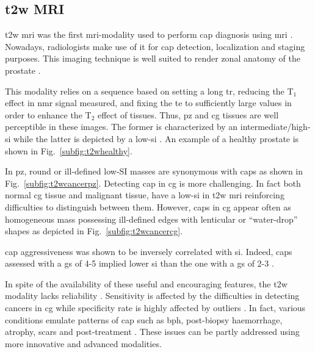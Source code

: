 \subsection{\acs*{t2w} MRI}\label{subsec:chp2:imaging:t2w} 
\ac{t2w} \ac{mri} was the first \ac{mri}-modality used to perform \ac{cap} diagnosis using \ac{mri} \cite{Hricak1983}.
Nowadays, radiologists make use of it for \ac{cap} detection, localization and staging purposes.
This imaging technique is well suited to render zonal anatomy of the prostate \cite{Barentsz2012}. 

This modality relies on a sequence based on setting a long \ac{tr}, reducing the T$_{1}$ effect in \ac{nmr} signal measured, and fixing the \ac{te} to sufficiently large values in order to enhance the T$_{2}$ effect of tissues.
Thus, \ac{pz} and \ac{cg} tissues are well perceptible in these images.
The former is characterized by an intermediate/high-\ac{si} while the latter is depicted by a low-\ac{si} \cite{Hricak1987}.
An example of a healthy prostate is shown in Fig.~\ref{subfig:t2whealthy}.

In \ac{pz}, round or ill-defined low-SI masses are synonymous with \acp{cap} \cite{Hricak1983} as shown in Fig.~\ref{subfig:t2wcancerpz}.
Detecting \ac{cap} in \ac{cg} is more challenging.
In fact both normal \ac{cg} tissue and malignant tissue, have a low-\ac{si} in \ac{t2w} \ac{mri} reinforcing difficulties to distinguish between them.
However, \acp{cap} in \ac{cg} appear often as homogeneous mass possessing ill-defined edges with lenticular or ``water-drop'' shapes \cite{Akin2006, Barentsz2012} as depicted in Fig.~\ref{subfig:t2wcancercg}. 

\ac{cap} aggressiveness was shown to be inversely correlated with \ac{si}.
Indeed, \acp{cap} assessed with a \ac{gs} of 4-5 implied lower \ac{si} than the one with a \ac{gs} of 2-3 \cite{Wang2008}.

In spite of the availability of these useful and encouraging features, the \ac{t2w} modality lacks reliability \cite{Kirkham2006,Hoeks2011}.
Sensitivity is affected by the difficulties in detecting cancers in \ac{cg} \cite{Kirkham2006} while specificity rate is highly affected by outliers \cite{Barentsz2012}.
In fact, various conditions emulate patterns of \ac{cap} such as \ac{bph}, post-biopsy haemorrhage, atrophy, scars and post-treatment \cite{Hricak1987,Quint1991,Scheidler1999,Cruz2002,Barentsz2012}.
These issues can be partly addressed using more innovative and advanced modalities.

